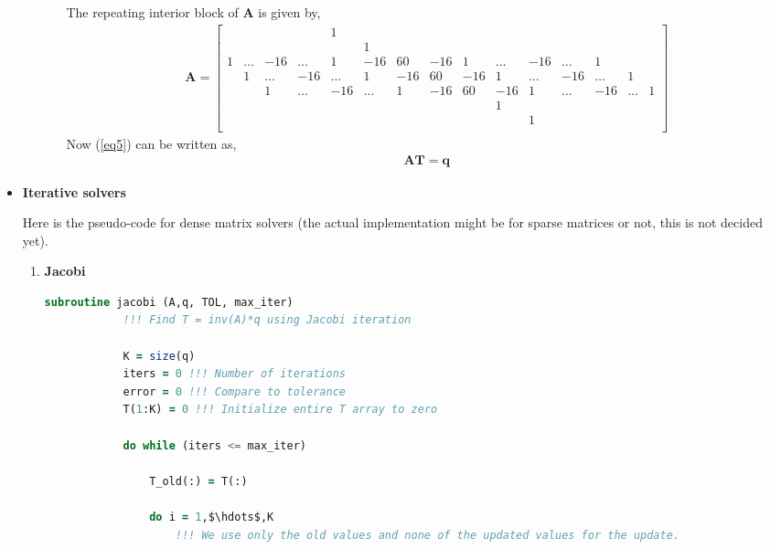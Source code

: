 \documentclass[12 pt, final]{article}
\begin{document}
\begin{itemize}
\begin{itemize}
\begin{enumerate}
            The repeating interior block of $\mathbf{A}$ is given by,
                    \begin{align*}
                    \mathbf{A} = \left[\begin{smallmatrix}
                  &&&&1\\
                  &&&&&1\\ 1&\hdots&-16&\hdots&1&-16&60&-16&1&\hdots&-16&\hdots& 1\\
                    &1&\hdots&-16&\hdots&1&-16&60&-16&1&\hdots&-16&\hdots& 1\\
                    &&1&\hdots&-16&\hdots&1&-16&60&-16&1&\hdots&-16&\hdots& 1\\
                    &&&&&&&&&1\\
                    &&&&&&&&&&1\\
                    \end{smallmatrix}\right]
                \end{align*}
             Now (\ref{eq5}) can be written as,
                \begin{align*}
                    \mathbf{AT} = \mathbf{q}
                \end{align*}
            \end{enumerate}
        \end{itemize}
    \item \textbf{Iterative solvers}
    
    Here is the pseudo-code for dense matrix solvers (the actual implementation might be for sparse matrices or not, this is not decided yet).
        \begin{enumerate}
            \item \textbf{Jacobi}
            \begin{lstlisting}[language=fortran,mathescape=true]
            subroutine jacobi (A,q, TOL, max_iter)
            !!! Find T = inv(A)*q using Jacobi iteration
            
            K = size(q)
            iters = 0 !!! Number of iterations
            error = 0 !!! Compare to tolerance
            T(1:K) = 0 !!! Initialize entire T array to zero
            
            do while (iters <= max_iter)
            
                T_old(:) = T(:)
                
                do i = 1,$\hdots$,K
                    !!! We use only the old values and none of the updated values for the update.
                    

\end{lstlisting}
\end{enumerate}
\end{itemize}
\end{document}
